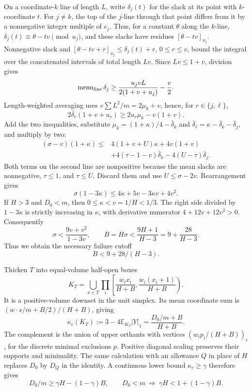 On a coordinate-\(k\) line of length \(L\), write \(\delta_j(t)\) for the
slack at its point with \(k\)-coordinate \(t\). For \(j\ne k\), the top
of the \(j\)-line through that point differs from it by a nonnegative
integer multiple of \(e_j\). Thus, for a constant \(\theta\) along the
\(k\)-line, \(\delta_j(t)\equiv\theta-tv\pmod{u_j}\), and these slacks
have residues \([\theta-tv]_{u_j}\).
Nonnegative slack and
\([\theta-tv+r]_{u_j}\le\delta_j(t)+r\), \(0\le r\le v\),
bound the integral over the concatenated intervals of total length \(Lv\).
Since \(Lv\le1+v\), division gives
\[
\operatorname{mean}_{\rm line}\delta_j
\ge\frac{u_jvL}{2(1+v+u_j)}-\frac v2.
\]
Length-weighted averaging uses \(v\sum L^2/m=2\mu_k+v\), hence, for
\(r\in\{j,\ell\}\),
\[
2\bar\delta_r(1+v+u_r)\ge2u_r\mu_k-v(1+v).
\]
Add the two inequalities, substitute
\(\mu_k=(1+\kappa)/4-\bar\delta_k\) and
\(\bar\delta_\ell=\kappa-\bar\delta_k-\bar\delta_j\), and multiply by two:
\[
\begin{aligned}
(\sigma-v)(1+\kappa)
\le{}&4(1+v+U)\kappa+4v(1+v)\\
&+4(\tau-1-v)\bar\delta_k
-4(U-\tau)\bar\delta_j.
\end{aligned}
\]
Both terms on the second line are nonpositive because the mean slacks are
nonnegative, \(\tau\le1\), and \(\tau\le U\). Discard them and use
\(U\le\sigma-2v\). Rearrangement gives
\begin{equation}
\boxed{\sigma(1-3\kappa)\le4\kappa+5v-3\kappa v+4v^2.}
\label{eq:p:7}
\end{equation}
If \(H>3\) and \(D_0<m\), then \(0\le\kappa<v=1/H<1/3\).
The right side divided by \(1-3\kappa\) is strictly increasing in \(\kappa\),
with derivative numerator \(4+12v+12v^2>0\).
Consequently
\[
\sigma<\frac{9v+v^2}{1-3v},\qquad
B=H\sigma<\frac{9H+1}{H-3}=9+\frac{28}{H-3}.
\]
Thus we obtain the necessary failure cutoff
\begin{equation}
\boxed{B<9+28/(H-3).}
\label{eq:p:8}
\end{equation}

Thicken \(T\) into equal-volume half-open boxes
\[
K_T=\bigcup_{x\in T}\prod_i
\left[\frac{w_ix_i}{H+B},\frac{w_i(x_i+1)}{H+B}\right).
\]
It is a positive-volume downset in the unit simplex.
Its mean coordinate sum is
\((w\cdot s/m+B/2)/(H+B)\), giving
\begin{equation}
\boxed{\kappa_c(K_T):=3-4\mathbb E_{K_T}|Y|_1
=\frac{D_0/m+B}{H+B}.}
\label{eq:p:9}
\end{equation}
The complement is the union of upper orthants with vertices
\((w_ip_i/(H+B))_i\), for the discrete minimal exclusions \(p\).
Positive diagonal scaling preserves their supports and minimality.
The same calculation with an allowance \(Q\) in place of \(H\) replaces
\(D_0\) by \(D_Q\) in the identity.
A continuous lower bound \(\kappa_c\ge\gamma\) therefore gives
\begin{equation}
D_0/m\ge\gamma H-(1-\gamma)B,\qquad
D_0<m\ \Longrightarrow\ \gamma H<1+(1-\gamma)B.
\label{eq:p:10}
\end{equation}

